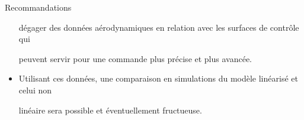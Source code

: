 \documentclass[xcolor=table]{beamer}
\begin{document}
\begin{frame}
\begin{onlyenv}
\begin{block}{Recommandations}
\begin{itemize}[<+->]
    \vspace{0.15cm}
    dégager des données aérodynamiques en relation avec les surfaces de contrôle qui

    \vspace{0.15cm}
    peuvent servir pour une commande plus précise et plus avancée.

    \vspace{0.15cm}
    \item Utilisant ces données, une comparaison en simulations du modèle linéarisé et celui non

    \vspace{0.15cm}
    linéaire sera possible et éventuellement fructueuse.
    \end{itemize}
  \end{block}
\end{onlyenv}
\end{frame}
\end{document}
